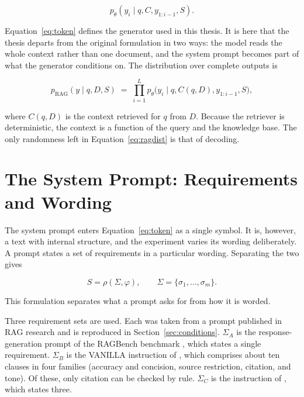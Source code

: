 \documentclass[12pt,a4paper,oneside]{scrreprt}
\begin{document}
\begin{equation}
\label{eq:token}
p_\theta(y_i \mid q,C,y_{1:i-1},S).
\end{equation}

Equation~\eqref{eq:token} defines the generator used in this thesis. It is here that the thesis departs from the original formulation in two ways: the model reads the whole context rather than one document, and the system prompt becomes part of what the generator conditions on. The distribution over complete outputs is

\begin{equation}
\label{eq:ragdist}
p_{\mathrm{RAG}}(y \mid q,D,S) \;=\; \prod_{i=1}^{L} p_\theta\bigl(y_i \mid q,C(q,D),y_{1:i-1},S\bigr),
\end{equation}

where $C(q,D)$ is the context retrieved for $q$ from $D$. Because the retriever is deterministic, the context is a function of the query and the knowledge base. The only randomness left in Equation~\eqref{eq:ragdist} is that of decoding. 

\section{The System Prompt: Requirements and Wording}
\label{sec:promptreq}

The system prompt enters Equation~\eqref{eq:token} as a single symbol. It is, however, a text with internal structure, and the experiment varies its wording deliberately. A prompt states a set of requirements in a particular wording. Separating the two gives

\begin{equation}
\label{eq:prompt}
S = \rho(\Sigma,\varphi), \qquad \Sigma = \{\sigma_1,\ldots,\sigma_m\}.
\end{equation}

This formulation separates what a prompt asks for from how it is worded. 

Three requirement sets are used. Each was taken from a prompt published in RAG research and is reproduced in Section~\ref{sec:conditions}. $\Sigma_A$ is the response-generation prompt of the RAGBench benchmark \citep{friel2024ragbench}, which states a single requirement. $\Sigma_B$ is the VANILLA instruction of \citet{gao2023alce}, which comprises about ten clauses in four families (accuracy and concision, source restriction, citation, and tone). Of these, only citation can be checked by rule. $\Sigma_C$ is the instruction of \citet{mao2024fitrag}, which states three.
\end{document}
